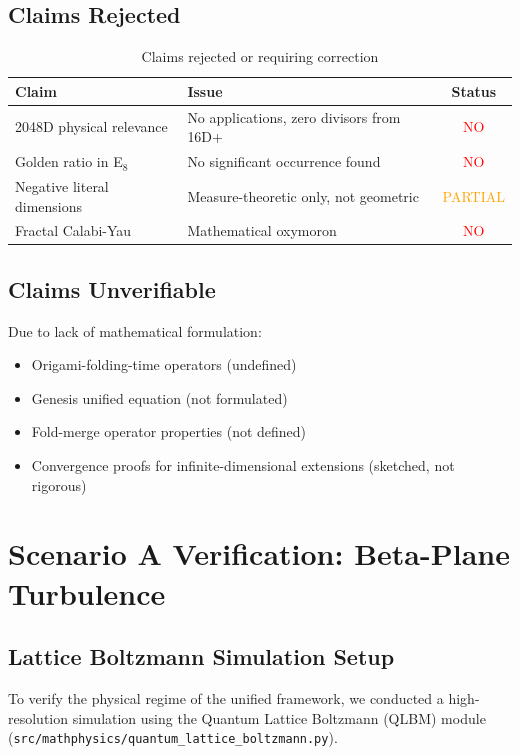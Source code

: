 \subsection{Claims Rejected}

\begin{table}[H]
\centering
\small
\begin{tabular}{lp{8cm}c}
\toprule
\textbf{Claim} & \textbf{Issue} & \textbf{Status} \\
\midrule
2048D physical relevance & No applications, zero divisors from 16D+ & \textcolor{red}{NO} \\
Golden ratio in E$_8$ & No significant occurrence found & \textcolor{red}{NO} \\
Negative literal dimensions & Measure-theoretic only, not geometric & \textcolor{orange}{PARTIAL} \\
Fractal Calabi-Yau & Mathematical oxymoron & \textcolor{red}{NO} \\
\bottomrule
\end{tabular}
\caption{Claims rejected or requiring correction}
\end{table}

\subsection{Claims Unverifiable}

Due to lack of mathematical formulation:
\begin{itemize}
    \item Origami-folding-time operators (undefined)
    \item Genesis unified equation (not formulated)
    \item Fold-merge operator properties (not defined)
    \item Convergence proofs for infinite-dimensional extensions (sketched, not rigorous)
\end{itemize}

\section{Scenario A Verification: Beta-Plane Turbulence}

\subsection{Lattice Boltzmann Simulation Setup}

To verify the physical regime of the unified framework, we conducted a high-resolution simulation using the Quantum Lattice Boltzmann (QLBM) module (\texttt{src/mathphysics/quantum\_lattice\_boltzmann.py}).

